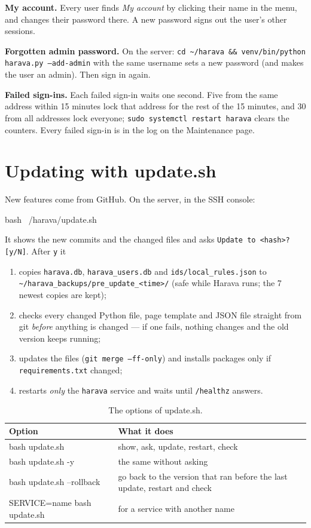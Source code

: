\documentclass[10pt,a4paper]{article}
\newcommand{\lead}[1]{\textbf{#1}\enspace}
\begin{document}
\lead{My account.} Every user finds \emph{My account} by clicking their name in the menu, and changes their password there. A new password signs out the user's other sessions.

\lead{Forgotten admin password.} On the server: \texttt{cd \textasciitilde/harava \&\& venv/bin/python harava.py --add-admin} with the same username sets a new password (and makes the user an admin). Then sign in again.

\lead{Failed sign-ins.} Each failed sign-in waits one second. Five from the same address within 15 minutes lock that address for the rest of the 15 minutes, and 30 from all addresses lock everyone; \texttt{sudo systemctl restart harava} clears the counters. Every failed sign-in is in the log on the Maintenance page.

\section{Updating with update.sh}\label{sec:update}
New features come from GitHub. On the server, in the SSH console:
\begin{cmd}
bash ~/harava/update.sh
\end{cmd}
It shows the new commits and the changed files and asks \texttt{Update to <hash>? [y/N]}. After \texttt{y} it
\begin{enumerate}[leftmargin=1.5em]
\item copies \texttt{harava.db}, \texttt{harava\_users.db} and \texttt{ids/local\_rules.json} to \texttt{\textasciitilde/harava\_backups/pre\_update\_<time>/} (safe while Harava runs; the 7 newest copies are kept);
\item checks every changed Python file, page template and JSON file straight from git \emph{before} anything is changed --- if one fails, nothing changes and the old version keeps running;
\item updates the files (\texttt{git merge --ff-only}) and installs packages only if \texttt{requirements.txt} changed;
\item restarts \emph{only} the \texttt{harava} service and waits until \texttt{/healthz} answers.
\end{enumerate}

\begin{table}[H]\small\centering
\caption{The options of update.sh.}
\begin{tabularx}{\textwidth}{>{\ttfamily}p{3.6cm}X}
\toprule
\normalfont\textbf{Option} & \textbf{What it does}\\
\midrule
bash update.sh & show, ask, update, restart, check\\
bash update.sh -y & the same without asking\\
bash update.sh --rollback & go back to the version that ran before the last update, restart and check\\
SERVICE=name bash update.sh & for a service with another name\\
\bottomrule
\end{tabularx}
\end{table}
\end{document}
